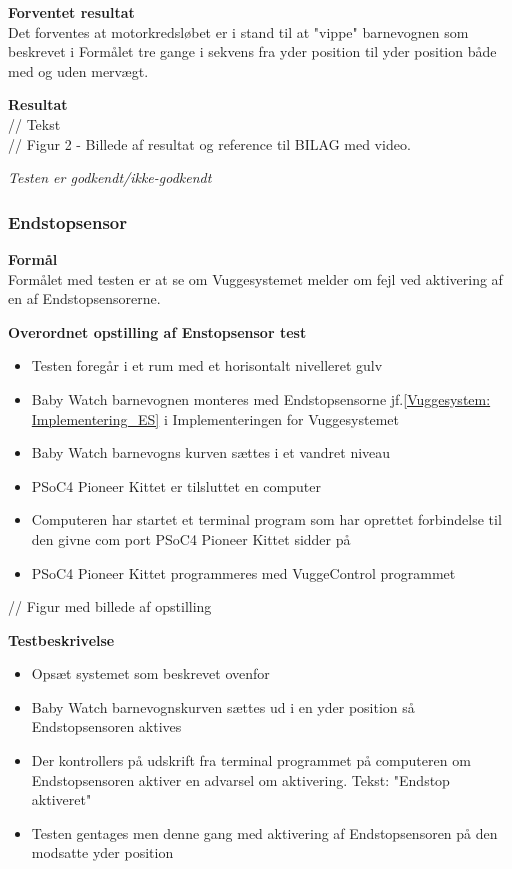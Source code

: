 \textbf{Forventet resultat} \\
Det forventes at motorkredsløbet er i stand til at "vippe" barnevognen som beskrevet i Formålet tre gange i sekvens fra yder position til yder position både med og uden mervægt.

\textbf{Resultat} \\
// Tekst \\

// Figur 2 - Billede af resultat og reference til BILAG med video.

\textit{Testen er godkendt/ikke-godkendt}



\subsubsection{Endstopsensor}
\textbf{Formål} \\
Formålet med testen er at se om Vuggesystemet melder om fejl ved aktivering af en af Endstopsensorerne.

\textbf{Overordnet opstilling af Enstopsensor test}

\begin{itemize}
	\item Testen foregår i et rum med et horisontalt nivelleret gulv
	\item Baby Watch barnevognen monteres med Endstopsensorne jf.\ref{Vuggesystem: Implementering_ES} i Implementeringen for Vuggesystemet 
	\item Baby Watch barnevogns kurven sættes i et vandret niveau
	\item PSoC4 Pioneer Kittet er tilsluttet en computer
	\item Computeren har startet et terminal program som har oprettet forbindelse til den givne com port PSoC4 Pioneer Kittet sidder på
	\item PSoC4 Pioneer Kittet programmeres med VuggeControl programmet
\end{itemize}

// Figur med billede af opstilling

\textbf{Testbeskrivelse}
\begin{itemize}
	\item Opsæt systemet som beskrevet ovenfor
	\item Baby Watch barnevognskurven sættes ud i en yder position så Endstopsensoren aktives
	\item Der kontrollers på udskrift fra terminal programmet på computeren om Endstopsensoren aktiver en advarsel om aktivering. Tekst: "Endstop aktiveret"
	\item Testen gentages men denne gang med aktivering af Endstopsensoren på den modsatte yder position
\end{itemize}

